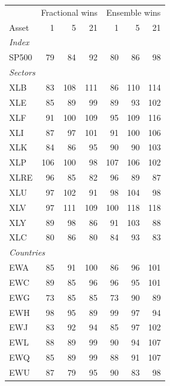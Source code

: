 \begin{tabular}{lrrrrrr}
\toprule
 & \multicolumn{3}{c}{Fractional wins} & \multicolumn{3}{c}{Ensemble wins} \\
Asset & 1 & 5 & 21 & 1 & 5 & 21 \\
\midrule
\multicolumn{7}{l}{\textit{Index}} \\
SP500 & 79 & 84 & 92 & 80 & 86 & 98 \\
\multicolumn{7}{l}{\textit{Sectors}} \\
XLB & 83 & 108 & 111 & 86 & 110 & 114 \\
XLE & 85 & 89 & 99 & 89 & 93 & 102 \\
XLF & 91 & 100 & 109 & 95 & 109 & 116 \\
XLI & 87 & 97 & 101 & 91 & 100 & 106 \\
XLK & 84 & 86 & 95 & 90 & 90 & 103 \\
XLP & 106 & 100 & 98 & 107 & 106 & 102 \\
XLRE & 96 & 85 & 82 & 96 & 89 & 87 \\
XLU & 97 & 102 & 91 & 98 & 104 & 98 \\
XLV & 97 & 111 & 109 & 100 & 118 & 118 \\
XLY & 89 & 98 & 86 & 91 & 103 & 88 \\
XLC & 80 & 86 & 80 & 84 & 93 & 83 \\
\multicolumn{7}{l}{\textit{Countries}} \\
EWA & 85 & 91 & 100 & 86 & 96 & 101 \\
EWC & 89 & 85 & 96 & 96 & 95 & 101 \\
EWG & 73 & 85 & 85 & 73 & 90 & 89 \\
EWH & 98 & 95 & 89 & 99 & 97 & 94 \\
EWJ & 83 & 92 & 94 & 85 & 97 & 102 \\
EWL & 88 & 89 & 99 & 90 & 94 & 107 \\
EWQ & 85 & 89 & 99 & 88 & 91 & 107 \\
EWU & 87 & 79 & 95 & 90 & 83 & 98 \\
\bottomrule
\end{tabular}
